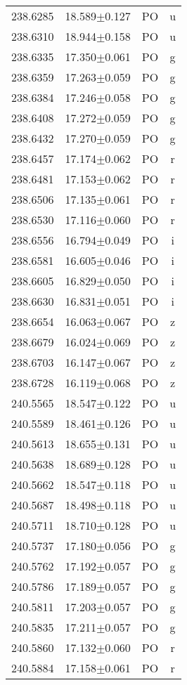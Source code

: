 \begin{table}
\begin{tabular}{cccc}
238.6285 & 18.589$\pm$0.127 & PO & u \\
238.6310 & 18.944$\pm$0.158 & PO & u \\
238.6335 & 17.350$\pm$0.061 & PO & g \\
238.6359 & 17.263$\pm$0.059 & PO & g \\
238.6384 & 17.246$\pm$0.058 & PO & g \\
238.6408 & 17.272$\pm$0.059 & PO & g \\
238.6432 & 17.270$\pm$0.059 & PO & g \\
238.6457 & 17.174$\pm$0.062 & PO & r \\
238.6481 & 17.153$\pm$0.062 & PO & r \\
238.6506 & 17.135$\pm$0.061 & PO & r \\
238.6530 & 17.116$\pm$0.060 & PO & r \\
238.6556 & 16.794$\pm$0.049 & PO & i \\
238.6581 & 16.605$\pm$0.046 & PO & i \\
238.6605 & 16.829$\pm$0.050 & PO & i \\
238.6630 & 16.831$\pm$0.051 & PO & i \\
238.6654 & 16.063$\pm$0.067 & PO & z \\
238.6679 & 16.024$\pm$0.069 & PO & z \\
238.6703 & 16.147$\pm$0.067 & PO & z \\
238.6728 & 16.119$\pm$0.068 & PO & z \\
240.5565 & 18.547$\pm$0.122 & PO & u \\
240.5589 & 18.461$\pm$0.126 & PO & u \\
240.5613 & 18.655$\pm$0.131 & PO & u \\
240.5638 & 18.689$\pm$0.128 & PO & u \\
240.5662 & 18.547$\pm$0.118 & PO & u \\
240.5687 & 18.498$\pm$0.118 & PO & u \\
240.5711 & 18.710$\pm$0.128 & PO & u \\
240.5737 & 17.180$\pm$0.056 & PO & g \\
240.5762 & 17.192$\pm$0.057 & PO & g \\
240.5786 & 17.189$\pm$0.057 & PO & g \\
240.5811 & 17.203$\pm$0.057 & PO & g \\
240.5835 & 17.211$\pm$0.057 & PO & g \\
240.5860 & 17.132$\pm$0.060 & PO & r \\
240.5884 & 17.158$\pm$0.061 & PO & r \\

\end{tabular}
\end{table}
